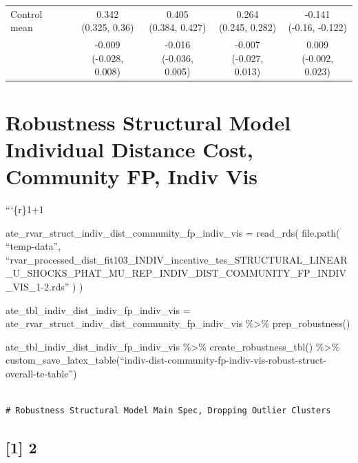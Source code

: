 \documentclass[
]{article}
\begin{document}
\begin{table}
{\begin{tabular}[t]{lcccc}
Control mean & \makecell[c]{0.342\\(0.325, 0.36)} & \makecell[c]{0.405\\(0.384, 0.427)} & \makecell[c]{0.264\\(0.245, 0.282)} & \makecell[c]{-0.141\\(-0.16, -0.122)}\\
\addlinespace
 & \makecell[c]{-0.009\\(-0.028, 0.008)} & \makecell[c]{-0.016\\(-0.036, 0.005)} & \makecell[c]{-0.007\\(-0.027, 0.013)} & \makecell[c]{0.009\\(-0.002, 0.023)}\\
\bottomrule
\end{tabular}}
\end{table}

\section{Robustness Structural Model Individual Distance Cost, Community
FP, Indiv
Vis}\label{robustness-structural-model-individual-distance-cost-community-fp-indiv-vis}

```\{r\}1+1

ate\_rvar\_struct\_indiv\_dist\_community\_fp\_indiv\_vis = read\_rds(
file.path( ``temp-data'',
``rvar\_processed\_dist\_fit103\_INDIV\_incentive\_tes\_STRUCTURAL\_LINEAR\_U\_SHOCKS\_PHAT\_MU\_REP\_INDIV\_DIST\_COMMUNITY\_FP\_INDIV\_VIS\_1-2.rds''
) )

ate\_tbl\_indiv\_dist\_indiv\_fp\_indiv\_vis =
ate\_rvar\_struct\_indiv\_dist\_community\_fp\_indiv\_vis
\%\textgreater\% prep\_robustness()

ate\_tbl\_indiv\_dist\_indiv\_fp\_indiv\_vis \%\textgreater\%
create\_robustness\_tbl() \%\textgreater\%
custom\_save\_latex\_table(``indiv-dist-community-fp-indiv-vis-robust-struct-overall-te-table'')

\begin{verbatim}

# Robustness Structural Model Main Spec, Dropping Outlier Clusters 

\end{verbatim}

\subsection{{[}1{]} 2}\label{section}

\begin{verbatim}
\end{verbatim}
\end{document}
